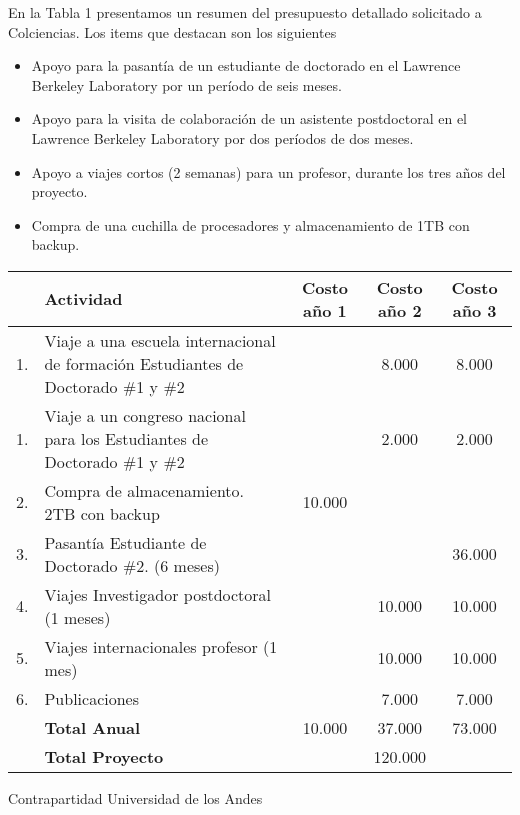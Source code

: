 \documentclass[12pt]{article}
\begin{document}
En la Tabla 1 presentamos un resumen del presupuesto detallado
solicitado a Colciencias. Los items que destacan son los siguientes

\begin{itemize}

\item Apoyo para la pasant\'ia de un estudiante de doctorado en el
  Lawrence Berkeley Laboratory por un per\'iodo de seis meses.
\item Apoyo para la visita de colaboraci\'on de un asistente postdoctoral en el
  Lawrence Berkeley Laboratory por dos per\'iodos de dos meses.
\item Apoyo a viajes cortos (2 semanas) para un profesor, durante los
  tres a\~nos del proyecto. 
\item Compra de una cuchilla de procesadores y almacenamiento de 1TB
  con backup.
\end{itemize}

\begin{tabular}{|l |p{4.5cm}| c |c |c|}\hline
 & Actividad & Costo a\~no 1 & Costo a\~no 2 & Costo a\~no 3\\\hline
1. & Viaje a una escuela internacional de formaci\'on Estudiantes de
Doctorado \#1 y \#2 & & 8.000 & 8.000\\\hline
1. & Viaje a un congreso nacional para los Estudiantes de
Doctorado \#1 y \#2 & & 2.000 & 2.000 \\\hline
2. & Compra de almacenamiento. 2TB con backup & 10.000 & & \\\hline
3. & Pasant\'ia Estudiante de Doctorado \#2. (6 meses)& &  & 36.000\\\hline
4. & Viajes Investigador postdoctoral (1 meses)& & 10.000 & 10.000\\\hline
5. & Viajes internacionales profesor (1 mes) & & 10.000 & 10.000 \\ \hline
6. & Publicaciones &  & 7.000 & 7.000\\\hline 
& {\bf Total Anual} & 10.000 & 37.000 & 73.000\\\hline
& {{\bf Total Proyecto}} & \multicolumn{3}{|c|}{120.000}\\\hline
\end{tabular}


Contrapartidad Universidad de los Andes
\end{document}
